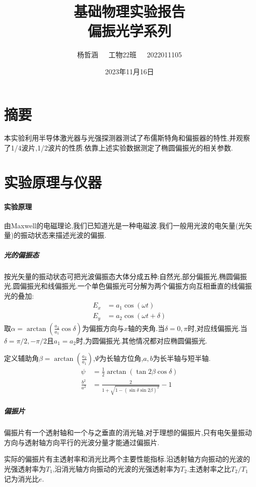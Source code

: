 \documentclass[UTF8,a4paper]{article}%
\title{\textbf{基础物理实验报告\\偏振光学系列}}
\author{杨哲涵~~~工物22班~~~2022011105}
\date{2023年11月16日}
\begin{document}
\maketitle
{}
\chead{}
\lfoot{}
\cfoot{\thepage}
\rfoot{}
\section*{摘要}
本实验利用半导体激光器与光强探测器测试了布儒斯特角和偏振器的特性,并观察了1/4波片,1/2波片的性质.依靠上述实验数据测定了椭圆偏振光的相关参数.
\section{实验原理与仪器}
\paragraph{实验原理}
由Maxwell的电磁理论,我们已知道光是一种电磁波.我们一般用光波的电矢量(光矢量)的振动状态来描述光波的偏振.
\subparagraph{光的偏振态}
按光矢量的振动状态可把光波偏振态大体分成五种:自然光,部分偏振光,椭圆偏振光,圆偏振光和线偏振光.一个单色偏振光可分解为两个偏振方向互相垂直的线偏振光的叠加:
\begin{align*}
    E_x & =a_1\cos(\omega t)        \\
    E_y & =a_2\cos(\omega t+\delta)
\end{align*}
取$\alpha=\arctan(\frac{a_2}{a_1}\cos\delta)$为偏振方向与$x$轴的夹角.当$\delta=0,\pi$时,对应线偏振光.当$\delta=\pi/2,-\pi/2$且$a_1=a_2$时,为圆偏振光.其他情况都对应椭圆偏振光.

定义辅助角$\beta=\arctan(\frac{a_2}{a_1})$,$\Psi$为长轴方位角,$a,b$为长半轴与短半轴.
\begin{align*}
    \psi            & =\frac{1}{2}\arctan(\tan2\beta\cos\delta)        \\
    \frac{b^2}{a^2} & =\frac{2}{1+\sqrt{1-(\sin\delta\sin2\beta)^2}}-1
\end{align*}
\subparagraph{偏振片}
偏振片有一个透射轴和一个与之垂直的消光轴,对于理想的偏振片,只有电矢量振动方向与透射轴方向平行的光波分量才能通过偏振片.

实际的偏振片有主透射率和消光比两个主要性能指标.沿透射轴方向振动的光波的光强透射率为$T_1$,沿消光轴方向振动的光波的光强透射率为$T_2$.主透射率之比$T_2/T_1$记为消光比$e$.
\end{document}
